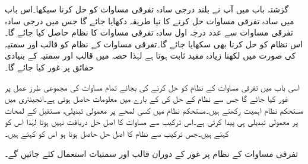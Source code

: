 گزشتہ باب میں آپ نے بلند درجی سادہ تفرقی مساوات کو حل کرنا سیکھا۔اس باب میں سادہ تفرقی مساوات حل کرنے کا نیا طریقہ دکھایا جائے گا جس میں  درجی سادہ تفرقی مساوات سے  عدد درجہ اول سادہ تفرقی مساوات کا نظام حاصل کیا جائے گا۔اس نظام کو حل کرنا بھی سکھایا جائے گا۔تفرقی مساوات کے نظام کو قالب اور سمتیہ کی صورت میں لکھنا زیادہ مفید ثابت ہوتا ہے لہٰذا حصہ  میں قالب اور سمتیہ کے بنیادی حقائق پر غور کیا جائے گا۔

اسی باب میں تفرقی مساوات کے نظام کو حل کرنے کی بجائے تمام مساوات کی مجموعی طرز عمل پر غور کیا جائے گا جس سے نظام کے حل کی  کے بارے میں معلومات حاصل ہوتی ہے۔انجینئری میں مستحکم نظام  اہمیت رکھتے ہیں۔مستحکم نظام میں کسی لمحے پر معمولی تبدیلی، مستقبل کے لمحات پر معمولی تبدیلی ہی پیدا کرتی ہے۔اس ترکیب سے مساوات کا اصل حل دریافت نہیں ہوتا لہٰذا اس کو  کہتے ہیں۔جس ترکیب سے نظام کا اصل حل حاصل ہوتا ہو اس کو  کہتے ہیں۔

 
تفرقی مساوات کے نظام پر غور کے دوران قالب اور سمتیات استعمال کئے جائیں گے۔

